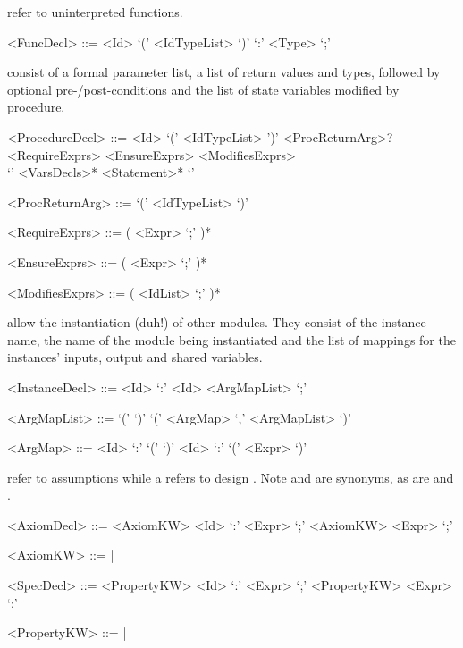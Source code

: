  refer to uninterpreted functions. 
\begin{grammar}
     <FuncDecl> ::= 
        <Id> `(' <IdTypeList> `)' `:' <Type> `;'

\end{grammar}

 consist of a formal parameter list, a list of return values and types, 
followed by optional pre-/post-conditions and the list of state variables modified by procedure.
\begin{grammar}
     <ProcedureDecl> ::=
        <Id> `(' <IdTypeList> ')' <ProcReturnArg>? \\
       <RequireExprs> <EnsureExprs> <ModifiesExprs> \\
       `{' <VarsDecls>* <Statement>* `}'

     <ProcReturnArg> ::=  `(' <IdTypeList> `)'

     <RequireExprs> ::= (  <Expr> `;' )*

     <EnsureExprs> ::= (  <Expr> `;' )*

     <ModifiesExprs> ::= (  <IdList> `;' )*

\end{grammar}

 allow the instantiation (duh!) of other modules. They consist of the instance name, the name of the module being instantiated and the list of mappings for the instances' inputs, output and shared variables. 
\begin{grammar}
     <InstanceDecl> ::=  <Id> `:' <Id> <ArgMapList> `;'

     <ArgMapList>   ::= `(' `)' 
                    \alt `(' <ArgMap> `,' <ArgMapList> `)'

     <ArgMap> ::= <Id> `:' `(' `)' 
              \alt <Id> `:' `(' <Expr> `)'
             
\end{grammar}

 refer to assumptions while a  refers to design . Note  and  are synonyms, as are  and .

\begin{grammar}
     <AxiomDecl> ::= <AxiomKW> <Id> `:' <Expr> `;'
                 \alt <AxiomKW> <Expr> `;'

     <AxiomKW> ::=  | 

     <SpecDecl> ::= <PropertyKW> <Id> `:' <Expr> `;'
                 \alt <PropertyKW> <Expr> `;'

     <PropertyKW> ::=  | 
\end{grammar}

